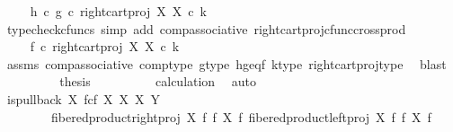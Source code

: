 \begin{isabellebody}
\ \isamarkupfalse%
\ {\isachardoublequoteopen}{\isachardot}{\kern0pt}{\isachardot}{\kern0pt}{\isachardot}{\kern0pt}\ {\isacharequal}{\kern0pt}\ h\ {\isasymcirc}\isactrlsub c\ g\ {\isasymcirc}\isactrlsub c\ right{\isacharunderscore}{\kern0pt}cart{\isacharunderscore}{\kern0pt}proj\ X\ X\ {\isasymcirc}\isactrlsub c\ k{\isachardoublequoteclose}\isanewline
\ \ \ \ \ \ \ \ \isamarkupfalse%
\ {\isacharparenleft}{\kern0pt}typecheck{\isacharunderscore}{\kern0pt}cfuncs{\isacharcomma}{\kern0pt}\ simp\ add{\isacharcolon}{\kern0pt}\ comp{\isacharunderscore}{\kern0pt}associative{}\ right{\isacharunderscore}{\kern0pt}cart{\isacharunderscore}{\kern0pt}proj{\isacharunderscore}{\kern0pt}cfunc{\isacharunderscore}{\kern0pt}cross{\isacharunderscore}{\kern0pt}prod{\isacharparenright}{\kern0pt}\isanewline
\ \ \ \ \ \ \isamarkupfalse%
\ \isamarkupfalse%
\ {\isachardoublequoteopen}{\isachardot}{\kern0pt}{\isachardot}{\kern0pt}{\isachardot}{\kern0pt}\ {\isacharequal}{\kern0pt}\ f\ {\isasymcirc}\isactrlsub c\ right{\isacharunderscore}{\kern0pt}cart{\isacharunderscore}{\kern0pt}proj\ X\ X\ {\isasymcirc}\isactrlsub c\ k{\isachardoublequoteclose}\isanewline
\ \ \ \ \ \ \ \ \isamarkupfalse%
\ assms{\isacharparenleft}{\kern0pt}{}{\isacharparenright}{\kern0pt}\ comp{\isacharunderscore}{\kern0pt}associative{}\ comp{\isacharunderscore}{\kern0pt}type\ g{\isacharunderscore}{\kern0pt}type\ h{\isacharunderscore}{\kern0pt}g{\isacharunderscore}{\kern0pt}eq{\isacharunderscore}{\kern0pt}f\ k{\isacharunderscore}{\kern0pt}type\ right{\isacharunderscore}{\kern0pt}cart{\isacharunderscore}{\kern0pt}proj{\isacharunderscore}{\kern0pt}type\ \isamarkupfalse%
\ blast\isanewline
\ \ \ \ \ \ \isamarkupfalse%
\ \isamarkupfalse%
\ {\isacharquery}{\kern0pt}thesis\isanewline
\ \ \ \ \ \ \ \ \isamarkupfalse%
\ calculation\ \isamarkupfalse%
\ auto\isanewline
\ \ \ \ \isamarkupfalse%
\isanewline
\isanewline
\ \ \ \ \isamarkupfalse%
\ {\isachardoublequoteopen}is{\isacharunderscore}{\kern0pt}pullback\ {\isacharparenleft}{\kern0pt}X\ \isactrlbsub f\isactrlesub {\isasymtimes}\isactrlsub c\isactrlbsub f\isactrlesub \ X{\isacharparenright}{\kern0pt}\ X\ X\ Y\isanewline
\ \ \ \ \ \ \ \ {\isacharparenleft}{\kern0pt}fibered{\isacharunderscore}{\kern0pt}product{\isacharunderscore}{\kern0pt}right{\isacharunderscore}{\kern0pt}proj\ X\ f\ f\ X{\isacharparenright}{\kern0pt}\ f\ {\isacharparenleft}{\kern0pt}fibered{\isacharunderscore}{\kern0pt}product{\isacharunderscore}{\kern0pt}left{\isacharunderscore}{\kern0pt}proj\ X\ f\ f\ X{\isacharparenright}{\kern0pt}\ f{\isachardoublequoteclose}\isanewline

\end{isabellebody}
